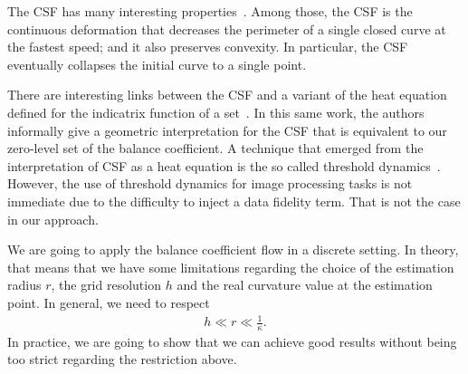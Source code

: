 \documentclass[smallextended]{svjour3}
\begin{document}
%
%
The CSF has many interesting properties~\cite{huisken84flow,gage86heat,ecker2008heat}. Among those, the CSF is the continuous deformation that decreases the perimeter of a single closed curve at the fastest speed; and it also preserves convexity. In particular, the CSF eventually collapses the initial curve to a single point.

There are interesting links between the CSF and a variant of the heat equation defined for the indicatrix function of a set~\cite{merriman1992diffusion}. In this same work, the authors informally give a geometric interpretation for the CSF that is equivalent to our zero-level set of the balance coefficient. A technique that emerged from the interpretation of CSF as a heat equation is the so called threshold dynamics~\cite{esedoglu2005threshold,esedoglu2008threshold}. However, the use of threshold dynamics for image processing tasks is not immediate due to the difficulty to inject a data fidelity term. That is not the case in our approach.

We are going to apply the balance coefficient flow in a discrete setting. In theory, that means that we have some limitations regarding the choice of the estimation radius $r$, the grid resolution $h$ and the real curvature value at the estimation point. In general, we need to respect
%
%
\begin{align*}
	h \ll r \ll \frac{1}{\kappa}.
\end{align*}
%
%
In practice, we are going to show that we can achieve good results without being too strict regarding the restriction above.
%
%
\end{document}
